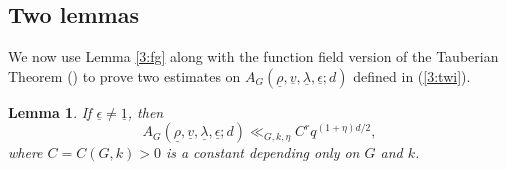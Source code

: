 \documentclass[12pt]{amsart}
\theoremstyle{plain}
\newtheorem{lemma}{Lemma}
\begin{document}
\subsection{Two lemmas}
We now use Lemma \ref{3:fg} along with the function field version of the Tauberian Theorem (\cite[Chap 17]{ros}) to prove two estimates on ${A_{G}({\underline{{\rho}}},{\underline{{v}}},{\underline{{\lambda}}},{\underline{{\epsilon}}};d)}$ defined in (\ref{3:twi}).

\begin{lemma} \label{3:ad1}
If ${\underline{{\epsilon}}} \ne {\underline{{1}}}$, then
\[{A_{G}({\underline{{\rho}}},{\underline{{v}}},{\underline{{\lambda}}},{\underline{{\epsilon}}};d)} \ll_{G,k,\eta} C^r q^{(1+\eta)d/2}, \]
where $C=C(G,k) >0$ is a constant depending only on $G$ and $k$.
\end{lemma}
\end{document}
